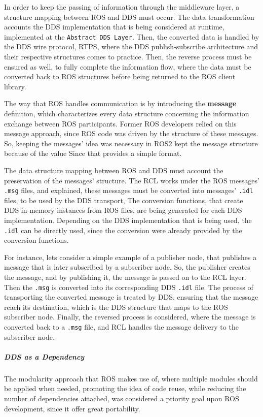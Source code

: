 In order to keep the passing of information through the middleware layer, a structure mapping between ROS and DDS must occur. The data transformation accounts the DDS implementation that is being considered at runtime, implemented at the \texttt{Abstract DDS Layer}. Then, the converted data is handled by the DDS wire protocol, RTPS, where the DDS publish-subscribe architecture and their respective structures comes to practice. Then, the reverse process must be ensured as well, to fully complete the information flow, where the data must be converted back to ROS structures before being returned to the ROS client library.
                    
The way that ROS handles communication is by introducing the \textbf{message} definition, which characterizes every data structure concerning the information exchange between ROS participants. Former ROS developers relied on this message approach, since ROS code was driven by the structure of these messages. So, keeping the messages' idea was necessary in ROS2 kept the message structure because of the value  Since that provides a simple format.  

The data structure mapping between ROS and DDS must account the preservation of the messages' structure. The RCL works under the ROS messages' \texttt{.msg} files, and explained, these messages must be converted into messages' \texttt{.idl} files, to be used by the DDS transport, The conversion functions, that create DDS in-memory instances from ROS files, are being generated for each DDS implementation. Depending on the DDS implementation that is being used, the \texttt{.idl} can be directly used, since the conversion were already provided by the conversion functions.
    
For instance, lets consider a simple example of a publisher node, that publishes a message that is later subscribed by a subscriber node. So, the publisher creates the message, and by publishing it, the message is passed on to the RCL layer. Then the \texttt{.msg} is converted into its corresponding DDS \texttt{.idl} file. The process of transporting the converted message is treated by DDS, ensuring that the message reach its destination, which is the DDS structure that maps to the ROS subscriber node. Finally, the reversed process is considered, where the message is converted back to a \texttt{.msg} file, and RCL handles the message delivery to the subscriber node. 


\subparagraph{DDS as a Dependency}

The modularity approach that ROS makes use of, where multiple modules should be applied when needed, promoting the idea of code reuse, while reducing the number of dependencies attached, was considered a priority goal upon ROS development, since it offer great portability.
                

